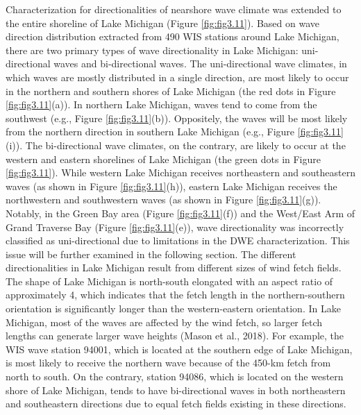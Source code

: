 Characterization for directionalities of nearshore wave climate was extended to the entire shoreline of Lake Michigan (Figure \ref{fig:fig3.11}). Based on wave direction distribution extracted from 490 WIS stations around Lake Michigan, there are two primary types of wave directionality in Lake Michigan: uni-directional waves and bi-directional waves. The uni-directional wave climates, in which waves are mostly distributed in a single direction, are most likely to occur in the northern and southern shores of Lake Michigan (the red dots in Figure \ref{fig:fig3.11}(a)). In northern Lake Michigan, waves tend to come from the southwest (e.g., Figure \ref{fig:fig3.11}(b)). Oppositely, the waves will be most likely from the northern direction in southern Lake Michigan (e.g., Figure \ref{fig:fig3.11}(i)). The bi-directional wave climates, on the contrary, are likely to occur at the western and eastern shorelines of Lake Michigan (the green dots in Figure \ref{fig:fig3.11}). While western Lake Michigan receives northeastern and southeastern waves (as shown in Figure \ref{fig:fig3.11}(h)), eastern Lake Michigan receives the northwestern and southwestern waves (as shown in Figure \ref{fig:fig3.11}(g)). Notably, in the Green Bay area (Figure \ref{fig:fig3.11}(f)) and the West/East Arm of Grand Traverse Bay (Figure \ref{fig:fig3.11}(e)), wave directionality was incorrectly classified as uni-directional due to limitations in the DWE characterization. This issue will be further examined in the following section. The different directionalities in Lake Michigan result from different sizes of wind fetch fields. The shape of Lake Michigan is north-south elongated with an aspect ratio of approximately 4, which indicates that the fetch length in the northern-southern orientation is significantly longer than the western-eastern orientation. In Lake Michigan, most of the waves are affected by the wind fetch, so larger fetch lengths can generate larger wave heights (Mason et al., 2018). For example, the WIS wave station 94001, which is located at the southern edge of Lake Michigan, is most likely to receive the northern wave because of the 450-km fetch from north to south. On the contrary, station 94086, which is located on the western shore of Lake Michigan, tends to have bi-directional waves in both northeastern and southeastern directions due to equal fetch fields existing in these directions. 

